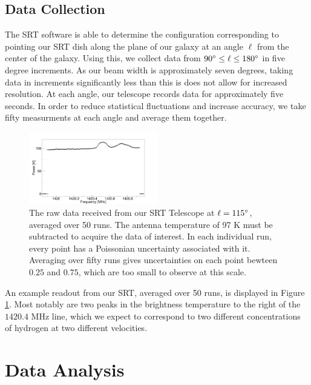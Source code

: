 \subsection{Data Collection}
The SRT software is able to determine the configuration corresponding to pointing our SRT dish along the plane of our galaxy at an angle $\ell$ from the center of the galaxy. Using this, we collect data from $90\degree \leq \ell \leq 180\degree$ in five degree increments. As our beam width is approximately seven degrees, taking data in increments significantly less than this is does not allow for increased resolution. At each angle, our telescope records data for approximately five seconds. In order to reduce statistical fluctuations and increase accuracy, we take fifty measurments at each angle and average them together.
\begin{figure}
  \includegraphics[width=0.5\textwidth]{data}
  \caption{The raw data received from our SRT Telescope at $\ell=115\degree$, averaged over 50 runs. The antenna temperature of 97 K must be subtracted to acquire the data of interest. In each individual run, every point has a Poissonian uncertainty associated with it. Averaging over fifty runs gives uncertainties on each point bewteen $0.25$ and $0.75$, which are too small to observe at this scale.}
  \label{raw}
\end{figure}
An example readout from our SRT, averaged over 50 runs, is displayed in Figure \ref{raw}. Most notably are two peaks in the brightness temperature to the right of the $1420.4$ MHz line, which we expect to correspond to two different concentrations of hydrogen at two different velocities.

\section{Data Analysis}
